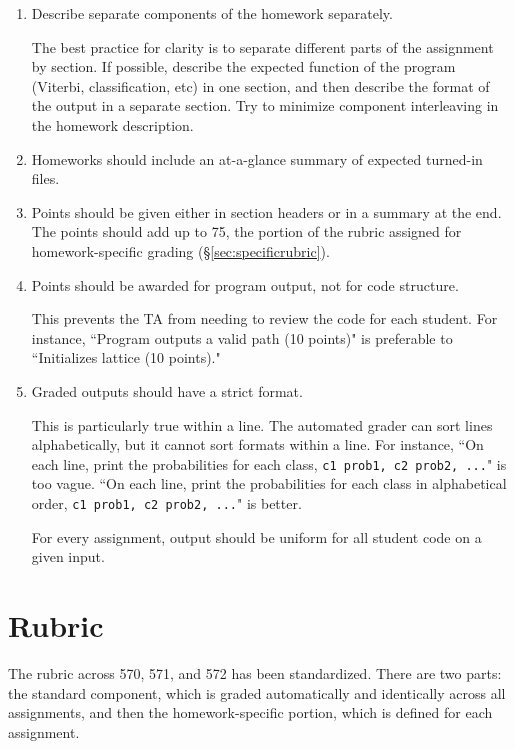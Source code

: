 \documentclass[12pt]{article}
\begin{document}
\begin{enumerate}
\item {Describe separate components of the homework separately. 

The best practice for clarity is to separate different parts of the assignment by section. If possible, describe the expected function of the program (Viterbi, classification, etc) in one section, and then describe the format of the output in a separate section. Try to minimize component interleaving in the homework description.}

\item {Homeworks should include an at-a-glance summary of expected turned-in files.}

\item {Points should be given either in section headers or in a summary at the end. The points should add up to 75, the portion of the rubric assigned for homework-specific grading (\S\ref{sec:specificrubric}).}

\item {Points should be awarded for program output, not for code structure.
  
  This prevents the TA from needing to review the code for each student. For instance, ``Program outputs a valid path (10 points)" is preferable to ``Initializes lattice (10 points)."}
 
\item {Graded outputs should have a strict format.
  
  This is particularly true within a line. The automated grader can sort lines alphabetically, but it cannot sort formats within a line. For instance, ``On each line, print the probabilities for each class, \texttt{c1 prob1, c2 prob2, ...}" is too vague. ``On each line, print the probabilities for each class in alphabetical order, \texttt{c1 prob1, c2 prob2, ...}" is better.
  
  For every assignment, output should be uniform for all student code on a given input.}

\end{enumerate}

\section{Rubric} \label{sec:rubric}

The rubric across 570, 571, and 572 has been standardized. There are two parts: the standard component, which is graded automatically and identically across all assignments, and then the homework-specific portion, which is defined for each assignment.
\end{document}
